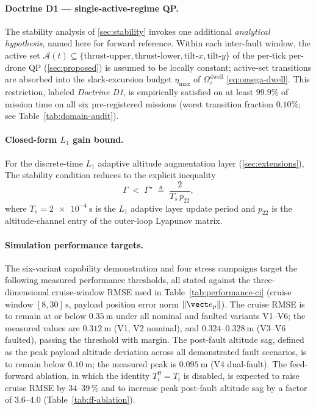 \paragraph{Doctrine D1 --- single-active-regime QP.} The stability analysis of \cref{sec:stability} invokes one additional \emph{analytical hypothesis}, named here for forward reference. Within each inter-fault window, the active set $\mathcal{A}(t) \subseteq \{\text{thrust-upper}, \text{thrust-lower}, \text{tilt-}x, \text{tilt-}y\}$ of the per-tick per-drone QP (\cref{sec:proposed}) is assumed to be locally constant; active-set transitions are absorbed into the slack-excursion budget $\eta_{\max}$ of $\Omega_\tau^{\mathrm{dwell}}$ \eqref{eq:omega-dwell}. This restriction, labeled \emph{Doctrine D1}, is empirically satisfied on at least $99.9\%$ of mission time on all six pre-registered missions (worst transition fraction $0.10\%$; see Table~\ref{tab:domain-audit}).

\paragraph{Closed-form $L_1$ gain bound.}For the discrete-time $L_1$ adaptive altitude augmentation layer (\cref{sec:extensions}), The stability condition reduces to the explicit inequality
\begin{equation}
  \Gamma \;<\; \Gamma^\star \;\triangleq\; \frac{2}{T_s\, p_{22}},
  \label{eq:l1-bound}
\end{equation}
where $T_s = \SI{2e-4}{\second}$ is the $L_1$ adaptive layer
update period and $p_{22}$ is the altitude-channel entry of the
outer-loop Lyapunov matrix.

\paragraph{Simulation performance targets.} The six-variant capability demonstration and four stress campaigns target the following measured performance thresholds, all stated against the three-dimensional cruise-window RMSE used in Table~\ref{tab:performance-ci} (cruise window $[8,30]\,\si{\second}$, payload position error norm $\|\vect e_p\|$). The cruise RMSE is to remain at or below $\SI{0.35}{\metre}$ under all nominal and faulted variants V1--V6; the measured values are $\SI{0.312}{\metre}$ (V1, V2 nominal), and $0.324$--$\SI{0.328}{\metre}$ (V3--V6 faulted), passing the threshold with margin. The post-fault altitude sag, defined as the peak payload altitude deviation across all demonstrated fault scenarios, is to remain below $\SI{0.10}{\metre}$; the measured peak is $\SI{0.095}{\metre}$ (V4 dual-fault). The feed-forward ablation, in which the identity $T_i^{\mathrm{ff}} = T_i$ is disabled, is expected to raise cruise RMSE by $34$--$39\,\%$ and to increase peak post-fault altitude sag by a factor of $3.6$--$4.0$ (Table~\ref{tab:ff-ablation}).
